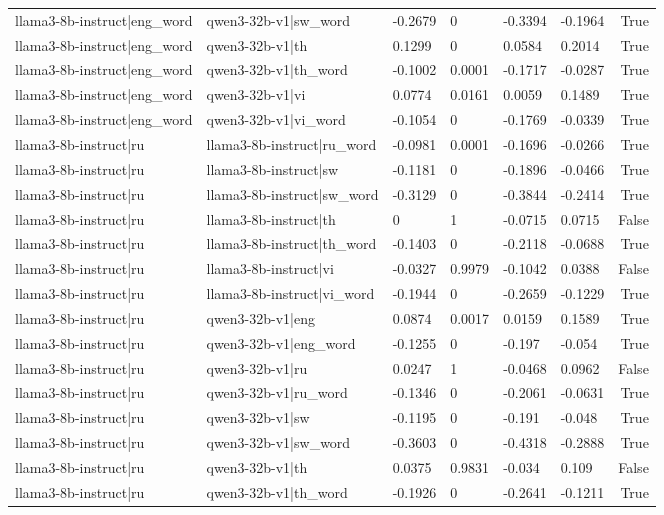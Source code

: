 \begin{table}
\begin{tabular}{llllllr}
llama3-8b-instruct|eng_word & qwen3-32b-v1|sw_word & -0.2679 & 0 & -0.3394 & -0.1964 & True \\
llama3-8b-instruct|eng_word & qwen3-32b-v1|th & 0.1299 & 0 & 0.0584 & 0.2014 & True \\
llama3-8b-instruct|eng_word & qwen3-32b-v1|th_word & -0.1002 & 0.0001 & -0.1717 & -0.0287 & True \\
llama3-8b-instruct|eng_word & qwen3-32b-v1|vi & 0.0774 & 0.0161 & 0.0059 & 0.1489 & True \\
llama3-8b-instruct|eng_word & qwen3-32b-v1|vi_word & -0.1054 & 0 & -0.1769 & -0.0339 & True \\
llama3-8b-instruct|ru & llama3-8b-instruct|ru_word & -0.0981 & 0.0001 & -0.1696 & -0.0266 & True \\
llama3-8b-instruct|ru & llama3-8b-instruct|sw & -0.1181 & 0 & -0.1896 & -0.0466 & True \\
llama3-8b-instruct|ru & llama3-8b-instruct|sw_word & -0.3129 & 0 & -0.3844 & -0.2414 & True \\
llama3-8b-instruct|ru & llama3-8b-instruct|th & 0 & 1 & -0.0715 & 0.0715 & False \\
llama3-8b-instruct|ru & llama3-8b-instruct|th_word & -0.1403 & 0 & -0.2118 & -0.0688 & True \\
llama3-8b-instruct|ru & llama3-8b-instruct|vi & -0.0327 & 0.9979 & -0.1042 & 0.0388 & False \\
llama3-8b-instruct|ru & llama3-8b-instruct|vi_word & -0.1944 & 0 & -0.2659 & -0.1229 & True \\
llama3-8b-instruct|ru & qwen3-32b-v1|eng & 0.0874 & 0.0017 & 0.0159 & 0.1589 & True \\
llama3-8b-instruct|ru & qwen3-32b-v1|eng_word & -0.1255 & 0 & -0.197 & -0.054 & True \\
llama3-8b-instruct|ru & qwen3-32b-v1|ru & 0.0247 & 1 & -0.0468 & 0.0962 & False \\
llama3-8b-instruct|ru & qwen3-32b-v1|ru_word & -0.1346 & 0 & -0.2061 & -0.0631 & True \\
llama3-8b-instruct|ru & qwen3-32b-v1|sw & -0.1195 & 0 & -0.191 & -0.048 & True \\
llama3-8b-instruct|ru & qwen3-32b-v1|sw_word & -0.3603 & 0 & -0.4318 & -0.2888 & True \\
llama3-8b-instruct|ru & qwen3-32b-v1|th & 0.0375 & 0.9831 & -0.034 & 0.109 & False \\
llama3-8b-instruct|ru & qwen3-32b-v1|th_word & -0.1926 & 0 & -0.2641 & -0.1211 & True \\

\end{tabular}
\end{table}
